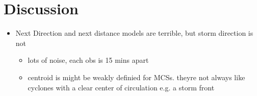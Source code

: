 \chapter{Discussion}
\label{ch:discuss}




\begin{itemize}
    \item Next Direction and next distance models are terrible, but storm direction is not
    \begin{itemize}
        \item lots of noise, each obs is 15 mins apart
        \item centroid is might be weakly definied for MCSs. theyre not always like cyclones with a clear center of circulation e.g. a storm front
    \end{itemize}
\end{itemize}
    